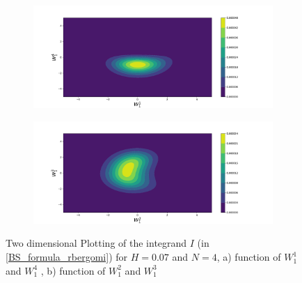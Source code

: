 \documentclass[11pt]{article}
\begin{document}
\begin{figure}[h!]
	\centering
	\begin{subfigure}{.4\textwidth}
		\centering
		\includegraphics[width=1\linewidth]{./figures/integrand_plotting_rBergomi/2D_plots/N_4/H_007/Bergomi_integrand_contours_K_1_H_007_W1_1_4_N_4}
		\caption{}
		\label{fig:sub3}
	\end{subfigure}%
	\begin{subfigure}{.4\textwidth}
		\centering
		\includegraphics[width=1\linewidth]{./figures/integrand_plotting_rBergomi/2D_plots/N_4/H_007/Bergomi_integrand_contours_K_1_H_007_W1_2_3_N_4}
		\caption{}
		\label{fig:sub4}
	\end{subfigure}
	\caption{Two dimensional Plotting of the integrand $I$ (in \eqref{BS_formula_rbergomi})  for $H=0.07$ and $N=4$, a)  function of $W_1^1$ and $W_1^4$ , b) function of $W_1^2$ and $W_1^3$ }
	\label{fig:Integrand_H_007_N_4_2D_W_1_4_2_3}
\end{figure}
\end{document}

